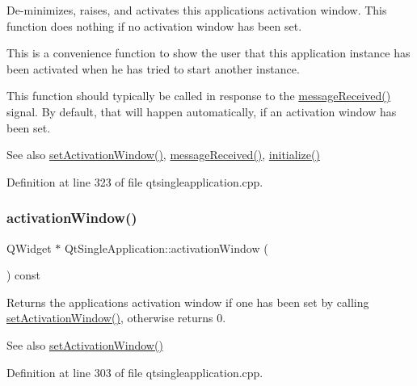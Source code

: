 De-\/minimizes, raises, and activates this application\textquotesingle{}s activation window. This function does nothing if no activation window has been set.

This is a convenience function to show the user that this application instance has been activated when he has tried to start another instance.

This function should typically be called in response to the \hyperlink{class_qt_single_application_a69340cef3d26d026e11424930e5a5866}{message\+Received()} signal. By default, that will happen automatically, if an activation window has been set.

\begin{DoxySeeAlso}{See also}
\hyperlink{class_qt_single_application_acb5347f6dc6822dbe4d6a78804043528}{set\+Activation\+Window()}, \hyperlink{class_qt_single_application_a69340cef3d26d026e11424930e5a5866}{message\+Received()}, \hyperlink{class_qt_single_application_a622807c60657c1a1fadec15ea5903b47}{initialize()} 
\end{DoxySeeAlso}


Definition at line 323 of file qtsingleapplication.\+cpp.

\mbox{\label{class_qt_single_application_ab3102811d7d4c84f355300873abdff2b}} 
\subsubsection{\texorpdfstring{activation\+Window()}{activationWindow()}}
{\footnotesize\ttfamily Q\+Widget $\ast$ Qt\+Single\+Application\+::activation\+Window (\begin{DoxyParamCaption}{ }\end{DoxyParamCaption}) const}

Returns the applications activation window if one has been set by calling \hyperlink{class_qt_single_application_acb5347f6dc6822dbe4d6a78804043528}{set\+Activation\+Window()}, otherwise returns 0.

\begin{DoxySeeAlso}{See also}
\hyperlink{class_qt_single_application_acb5347f6dc6822dbe4d6a78804043528}{set\+Activation\+Window()} 
\end{DoxySeeAlso}


Definition at line 303 of file qtsingleapplication.\+cpp.

